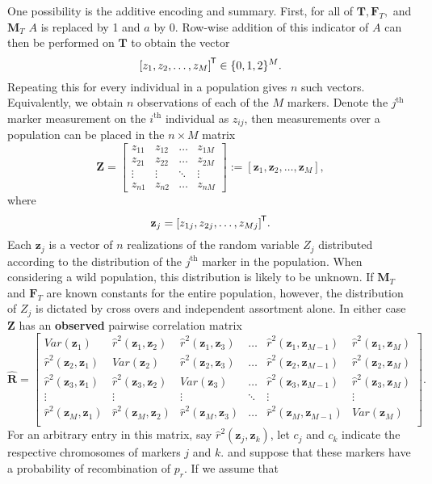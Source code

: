 \documentclass{article}
\newcommand{\ve}[1]{\mathbf{#1}}           %
\newcommand{\m}[1]{\mathbf{#1}}               %
\newcommand{\tr}[1]{{#1}^{\mkern-1.5mu\mathsf{T}}}              %
\newcommand{\obscorr}{\widehat{r}^2}
\begin{document}
One possibility is the additive encoding and summary. First, for all of $\m{T}, \m{F}_T,$ and $\m{M}_T$ $A$ is replaced by 1 and $a$ by 0. Row-wise addition of this indicator of $A$ can then be performed on $\m{T}$ to obtain the vector
$$\tr{[z_1, z_2, \dots, z_M]} \in \{0,1,2\}^M.$$
Repeating this for every individual in a population gives $n$ such vectors. Equivalently, we obtain $n$ observations of each of the $M$ markers. Denote the $j^{\text{th}}$ marker measurement on the $i^{\text{th}}$ individual as $z_{ij}$, then measurements over a population can be placed in the $n \times M$ matrix
$$\m{Z} = \begin{bmatrix}
  z_{11} & z_{12} & \dots & z_{1M} \\
  z_{21} & z_{22} & \dots & z_{2M} \\
  \vdots & \vdots & \ddots & \vdots \\
  z_{n1} & z_{n2} & \dots & z_{nM}
\end{bmatrix} := [\ve{z}_1, \ve{z}_2, \dots, \ve{z}_M],$$
where
$$\ve{z}_j = \tr{[z_{1j}, z_{2j}, \dots, z_{Mj}]}.$$
Each $\ve{z}_j$ is a vector of $n$ realizations of the random variable $Z_j$ distributed according to the distribution of the $j^{\text{th}}$ marker in the population. When considering a wild population, this distribution is likely to be unknown. If $\m{M}_T$ and $\m{F}_T$ are known constants for the entire population, however, the distribution of $Z_j$ is dictated by cross overs and independent assortment alone. In either case $\m{Z}$ has an \textbf{observed} pairwise correlation matrix
$$\widehat{\m{R}} = \begin{bmatrix}
  Var(\ve{z}_1) & \obscorr(\ve{z}_1, \ve{z}_2) & \obscorr(\ve{z}_1, \ve{z}_3) & \dots & \obscorr(\ve{z}_1, \ve{z}_{M-1}) & \obscorr(\ve{z}_1, \ve{z}_M) \\
  \obscorr(\ve{z}_2, \ve{z}_1) & Var(\ve{z}_2) & \obscorr(\ve{z}_2, \ve{z}_3) & \dots & \obscorr(\ve{z}_2, \ve{z}_{M-1}) & \obscorr(\ve{z}_2, \ve{z}_M) \\
  \obscorr(\ve{z}_3, \ve{z}_1) & \obscorr(\ve{z}_3, \ve{z}_2) & Var(\ve{z}_3) & \dots & \obscorr(\ve{z}_3, \ve{z}_{M-1}) & \obscorr(\ve{z}_3, \ve{z}_M) \\
  \vdots & \vdots & \vdots & \ddots & \vdots & \vdots \\
  \obscorr(\ve{z}_M, \ve{z}_1) & \obscorr(\ve{z}_M, \ve{z}_2) & \obscorr(\ve{z}_M, \ve{z}_3) & \dots & \obscorr(\ve{z}_M, \ve{z}_{M-1}) & Var(\ve{z}_M) \\
\end{bmatrix}.$$
For an arbitrary entry in this matrix, say $\obscorr(\ve{z}_j, \ve{z}_k)$, let $c_j$ and $c_k$ indicate the respective chromosomes of markers $j$ and $k$. and suppose that these markers have a probability of recombination of $p_r$. If we assume that
\end{document}
